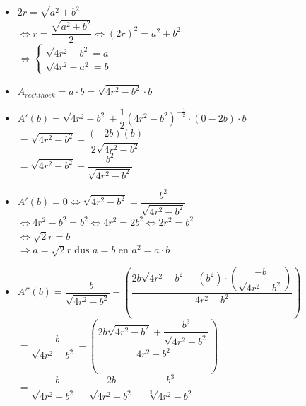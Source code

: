 \documentclass[a4paper]{article}
\begin{document}
\begin{itemize}

	\item $ 2r =  \sqrt{a^2 + b^2}$\\

	$\Leftrightarrow r = \dfrac{\sqrt{a^2 + b^2}}{2} \Leftrightarrow (2r)^2 = a^2 + b^2$\\

	$\Leftrightarrow \left\{
					\begin{array}{lll}
					 \sqrt{4r^2 - b^2} = a\\
					 \sqrt{4r^2 - a^2} = b
					\end{array}
				\right.$
 	\item $A_{rechthoek} = a \cdot b = \sqrt{4r^2 - b^2} \cdot b$\\
	
	\item $A'(b) = \sqrt{4r^2 - b^2} + \dfrac{1}{2} (4r^2 - b^2)^{-\tfrac{1}{2}}\cdot (0 -2b) \cdot b$\\
	
	$ = \sqrt{4r^2 - b^2} + \dfrac{(-2b)(b)}{2\sqrt{4r^2-b^2}}$\\
	
	$ = \sqrt{4r^2 - b^2} - \dfrac{b^2}{\sqrt{4r^2 - b^2}}$\\
	
	\item $A'(b) = 0 \Leftrightarrow \sqrt{4r^2 - b^2} = \dfrac{b^2}{\sqrt{4r^2 - b^2}}$\\
	
	$\Leftrightarrow 4r^2 - b^2 = b^2 \Leftrightarrow 4r^2 = 2b^2 \Leftrightarrow 2r^2 = b^2$\\
	
	$\Leftrightarrow \sqrt{2}r = b$\\
	
	$ \Rightarrow a = \sqrt{2}r \text{ dus } a = b \text{ en } a^2 = a \cdot b$\\
	
	\item $A''(b) = \dfrac{-b}{\sqrt{4r^2 - b^2}} - \left(\dfrac{2b\sqrt{4r^2-b^2} -(b^2)\cdot\left(\dfrac{-b}{\sqrt{4r^2-b^2}}\right)}{4r^2 - b^2}\right)$\\
	
	$ = \dfrac{-b}{\sqrt{4r^2 - b^2}} - \left(\dfrac{2b\sqrt{4r^2-b^2} + \dfrac{b^3}{\sqrt{4r^2-b^2}}}{4r^2 - b^2}\right)$\\
	
	$ = \dfrac{-b}{\sqrt{4r^2 - b^2}} - \dfrac{2b}{\sqrt{4r^2 - b^2}} - \dfrac{b^3}{\sqrt[3]{4r^2 - b^2}} $\\
	

\end{itemize}
\end{document}
